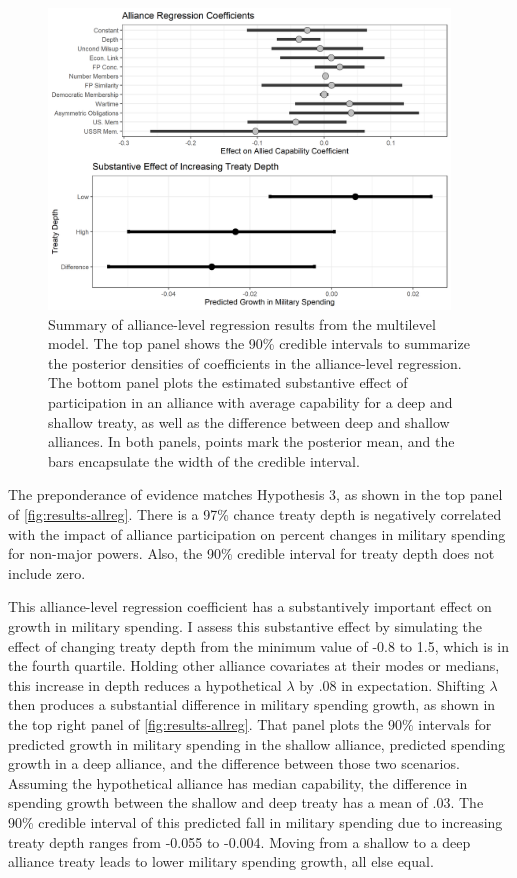 \documentclass[12pt]{article}
\begin{document}
\begin{figure}[htbp]
	\centering
		\includegraphics[width=0.95\textwidth]{../figures/results-allreg.png}
	\caption{Summary of alliance-level regression results from the multilevel model. The top panel shows the 90\% credible intervals to summarize the posterior densities of coefficients in the alliance-level regression. The bottom panel plots the estimated substantive effect of participation in an alliance with average capability for a deep and shallow treaty, as well as the difference between deep and shallow alliances. In both panels, points mark the posterior mean, and the bars encapsulate the width of the credible interval. }
	\label{fig:results-allreg}
\end{figure}


The preponderance of evidence matches Hypothesis 3, as shown in the top panel of \autoref{fig:results-allreg}.
There is a 97\% chance treaty depth is negatively correlated with the impact of alliance participation on percent changes in military spending for non-major powers.
Also, the 90\% credible interval for treaty depth does not include zero. 


This alliance-level regression coefficient has a substantively important effect on growth in military spending. 
I assess this substantive effect by simulating the effect of changing treaty depth from the minimum value of -0.8 to 1.5, which is in the fourth quartile. 
Holding other alliance covariates at their modes or medians, this increase in depth reduces a hypothetical $\lambda$ by .08 in expectation.
Shifting $\lambda$ then produces a substantial difference in military spending growth, as shown in the top right panel of \autoref{fig:results-allreg}.
That panel plots the 90\% intervals for predicted growth in military spending in the shallow alliance, predicted spending growth in a deep alliance, and the difference between those two scenarios.
Assuming the hypothetical alliance has median capability, the difference in spending growth between the shallow and deep treaty has a mean of .03.
The 90\% credible interval of this predicted fall in military spending due to increasing treaty depth ranges from -0.055 to -0.004.
Moving from a shallow to a deep alliance treaty leads to lower military spending growth, all else equal.  
\end{document}
